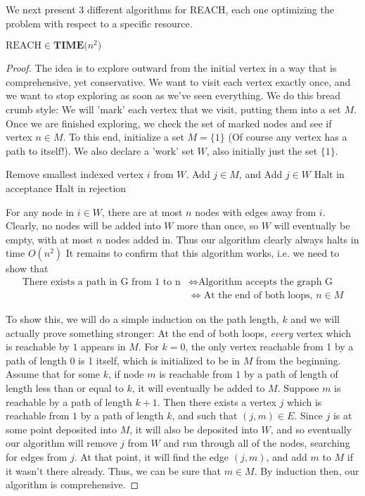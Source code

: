We next present 3 different algorithms for REACH, each one optimizing the problem with respect to a specific resource. 
\begin{theorem}
    $\textrm{REACH} \in \textbf{TIME($n^2$)}$
\end{theorem}
\begin{proof}
The idea is to explore outward from the initial vertex in a way that is comprehensive, yet conservative. We want to visit each vertex exactly once, and we want to stop exploring as soon as we've seen everything. We do this bread crumb style: We will 'mark' each vertex that we visit, putting them into a set $M$. Once we are finished exploring, we check the set of marked nodes and see if vertex $n \in M$. To this end, initialize a set $M = \{1\}$ (Of course any vertex has a path to itself!). We also declare a 'work' set $W$, also initially just the set $\{1\}$. 
\begin{algorithmic}
    \STATE Remove smallest indexed vertex $i$ from $W$.
            \STATE Add $j \in M$, and Add $j \in W$
        \ENDIF    
    \ENDFOR
\ENDWHILE
{}
    \STATE Halt in acceptance
\ELSE
    \STATE Halt in rejection
\ENDIF
\end{algorithmic}
\par For any node in $i \in W$, there are at most $n$ nodes with edges away from $i$. Clearly, no nodes will be added into $W$ more than once, so $W$ will eventually be empty, with at most $n$ nodes added in. Thus our algorithm clearly always halts in time $O(n^2)$ It remains to confirm that this algorithm works, i.e. we need to show that
\begin{align*}
    \textrm{There exists a path in G from 1 to n} & \iff \textrm{Algorithm accepts the graph G} \\
                                                & \iff \textrm{At the end of both loops, $n \in M$}
\end{align*}
\par To show this, we will do a simple induction on the path length, $k$ and we will actually prove something stronger: At the end of both loops, \textit{every} vertex which is reachable by $1$ appears in $M$. For $k=0$, the only vertex reachable from 1 by a path of length 0 is 1 itself, which is initialized to be in $M$ from the beginning. Assume that for some $k$, if node $m$ is reachable from $1$ by a path of length of length less than or equal to $k$, it will eventually be added to $M$. Suppose $m$ is reachable by a path of length $k+1$. Then there exists a vertex $j$ which is reachable from $1$ by a path of length $k$, and such that $(j,m) \in E$. Since $j$ is at some point deposited into $M$, it will also be deposited into $W$, and so eventually our algorithm will remove $j$ from $W$ and run through all of the nodes, searching for edges from $j$. At that point, it will find the edge $(j,m)$, and add $m$ to $M$ if it wasn't there already. Thus, we can be sure that $m \in M$. By induction then, our algorithm is comprehensive.

\end{proof}
